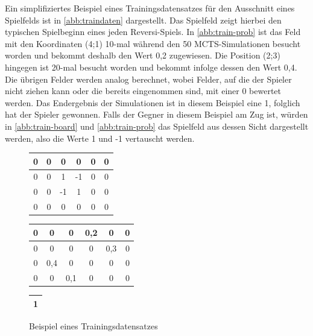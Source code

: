 \documentclass[12pt,a4paper,bibliography=totocnumbered,listof=totocnumbered]{article}
\begin{document}
Ein simplifiziertes Beispiel eines Trainingsdatensatzes für den Ausschnitt eines Spielfelds ist in \autoref{abb:traindaten} dargestellt. Das Spielfeld zeigt hierbei den typischen Spielbeginn eines jeden Reversi-Spiels. In \autoref{abb:train-prob} ist das Feld mit den Koordinaten (4;1) 10-mal während den 50 MCTS-Simulationen besucht worden und bekommt deshalb den Wert 0,2 zugewiesen. Die Position (2;3) hingegen ist 20-mal besucht worden und bekommt infolge dessen den Wert 0,4. Die übrigen Felder werden analog berechnet, wobei Felder, auf die der Spieler nicht ziehen kann oder  die bereits eingenommen sind, mit einer 0 bewertet werden. Das Endergebnis der Simulationen ist in diesem Beispiel eine 1, folglich hat der Spieler gewonnen. Falls der Gegner in diesem Beispiel am Zug ist, würden in \autoref{abb:train-board} und \autoref{abb:train-prob} das Spielfeld aus dessen Sicht dargestellt werden, also die Werte 1 und -1 vertauscht werden.
\begin{figure} [h]
\centering
\begin{minipage}[b]{0.25\linewidth}
\centering
\begin{tabular}{|c|c|c|c|c|c|}
\hline
0 & 0 & 0  & 0  & 0 & 0 \\ \hline
0 & 0 & 1  & -1 & 0 & 0 \\ \hline
0 & 0 & -1 & 1  & 0 & 0 \\ \hline
0 & 0 & 0  & 0  & 0 & 0 \\ \hline
\end{tabular}
\label{abb:train-board}
\end{minipage}
\qquad
\begin{minipage}[b]{0.3\linewidth}
\centering
\begin{tabular}{|c|c|c|c|c|c|}
\hline
0 & 0   & 0   & 0,2 & 0   & 0 \\ \hline
0 & 0   & 0   & 0   & 0,3 & 0 \\ \hline
0 & 0,4 & 0   & 0   & 0   & 0 \\ \hline
0 & 0   & 0,1 & 0   & 0   & 0 \\ \hline
\end{tabular}
\label{abb:train-prob}
\end{minipage}
\qquad
\begin{minipage}[b]{0.3\linewidth}
	\centering
   \begin{tabular}{|r|}
    \hline
    1 \\
    \hline
    \end{tabular}%
  \label{tab:addlabel}%
\label{abb:train-ergebnis}
\end{minipage}
\caption{Beispiel eines Trainingsdatensatzes}
\label{abb:traindaten}
\end{figure}
\end{document}
